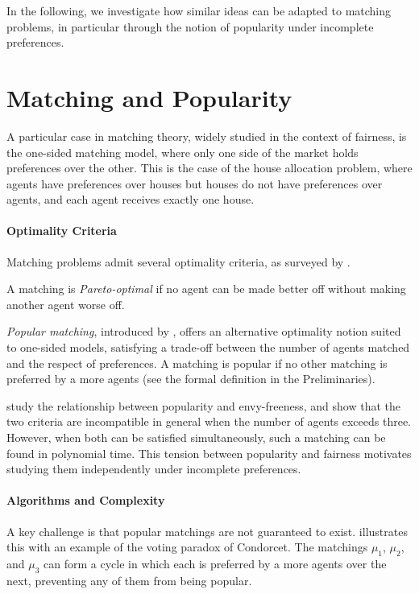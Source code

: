 \documentclass{article}
\begin{document}
In the following, we investigate how similar ideas can be adapted to matching problems, in particular through the notion of popularity under incomplete preferences.


\section{Matching and Popularity}

A particular case in matching theory, widely studied in the context of fairness, is the one-sided matching model, where only one side of the market holds preferences over the other. 
This is the case of the house allocation problem, where agents have preferences over houses but houses do not have preferences over agents, and each agent receives exactly one house. 

\paragraph{Optimality Criteria}

Matching problems admit several optimality criteria, as surveyed by \cite{cseh2017popular}.

A matching is \emph{Pareto-optimal} if no agent can be made better off without making another agent worse off. 

\emph{Popular matching}, introduced by \cite{gardenfors1975match}, offers an alternative optimality notion suited to one-sided models, satisfying a trade-off between the number of agents matched and the respect of preferences.
A matching is popular if no other matching is preferred by a more agents (see the formal definition in the Preliminaries). 

\cite{aziz2013popular} study the relationship between popularity and envy-freeness, and show that the two criteria are incompatible in general when the number of agents exceeds three. 
However, when both can be satisfied simultaneously, such a matching can be found in polynomial time. 
This tension between popularity and fairness motivates studying them independently under incomplete preferences.

\paragraph{Algorithms and Complexity}

A key challenge is that popular matchings are not guaranteed to exist. 
\cite{cseh2017popular} illustrates this with an example of the voting paradox of Condorcet.
The matchings $\mu_1$, $\mu_2$, and $\mu_3$ can form a cycle in which each is preferred by a more agents over the next, preventing any of them from being popular.
\end{document}
